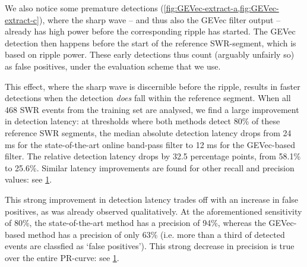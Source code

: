 We also notice some premature detections (\cref{fig:GEVec-extract-a,fig:GEVec-extract-c}), where the sharp wave -- and thus also the GEVec filter output -- already has high power before the corresponding ripple has started. The GEVec detection then happens before the start of the reference SWR-segment, which is based on ripple power. These early detections thus count (arguably unfairly so) as false positives, under the evaluation scheme that we use.

\begin{figure}
\label{fig:LSM-PR-and-latency}
\end{figure}

This effect, where the sharp wave is discernible before the ripple, results in faster detections when the detection \emph{does} fall within the reference segment. When all 468 SWR events from the training set are analysed, we find a large improvement in detection latency: at thresholds where both methods detect 80\% of these reference SWR segments, the median absolute detection latency drops from 24 ms for the state-of-the-art online band-pass filter to 12 ms for the GEVec-based filter. The relative detection latency drops by 32.5 percentage points, from 58.1\% to 25.6\%. Similar latency improvements are found for other recall and precision values: see \cref{fig:LSM-PR-and-latency}.

This strong improvement in detection latency trades off with an increase in false positives, as was already observed qualitatively. At the aforementioned sensitivity of 80\%, the state-of-the-art method has a precision of 94\%, whereas the GEVec-based method has a precision of only 63\% (i.e. more than a third of detected events are classfied as `false positives'). This strong decrease in precision is true over the entire PR-curve: see \cref{fig:LSM-PR-and-latency}.
